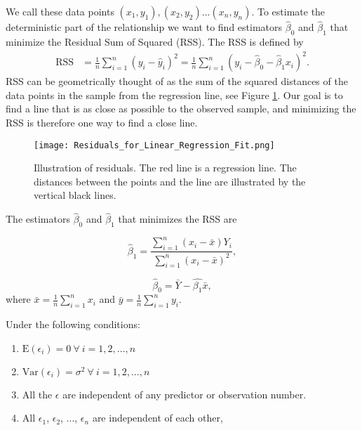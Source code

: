 \documentclass{article}
\begin{document}
We call these data points \((x_1, y_1), (x_2, y_2)
... (x_n, y_n)\). To estimate the deterministic part of the relationship we want
to find estimators \(\hat{\beta}_0\) and \(\hat{\beta}_1\) that minimize the
Residual Sum of Squared (RSS). The RSS is defined by
\begin{align*}
  \mathrm{RSS} &= \frac{1}{n} \sum_{i = 1}^n \left( y_i - \hat{y}_i \right)^2 
  = \frac{1}{n} \sum_{i = 1}^n \left( y_i - \hat{\beta}_0 - \hat{\beta}_1 x_i \right)^2.
\end{align*}
RSS can be geometrically thought of as the sum of the squared distances of
the data points in the sample from the regression line, see Figure \ref{fig:residuals}. Our goal is to find a
line that is as close as possible to the observed sample, and minimizing the RSS
is therefore one way to find a close line.

\begin{figure}
  \centering
  \texttt{[image: Residuals\_for\_Linear\_Regression\_Fit.png]}
  \caption{Illustration of residuals. The red line is a regression line. The
    distances between the points and the line are illustrated by the vertical
    black lines. \cite{residualsFigure}}
  \label{fig:residuals}
  
\end{figure}

The estimators \(\hat{\beta}_0\) and \(\hat{\beta}_1\) that minimizes the RSS are

\begin{equation*}
 \hat{\beta}_1 = \frac{\sum_{i = 1}^n\left( x_i - \bar{x} \right) Y_i}{\sum_{i = 1}^n\left( x_i - \bar{x} \right)^2} ,
\end{equation*}

\begin{equation*}
 \hat{\beta}_0 = \bar{Y} - \hat{\beta_1}\bar{x},
\end{equation*}
where \(\bar{x} = \frac{1}{n} \sum_{i = 1}^n x_i\) and \(\bar{y} = \frac{1}{n} \sum_{i = 1}^n y_i\).

Under the following conditions:

\begin{enumerate}
\item \(\mathrm{E} \left( \epsilon_i \right) = 0\ \forall \ i = 1, 2, ..., n\)
\item \(\mathrm{Var} \left( \epsilon_i \right) = \sigma^2\ \forall \ i = 1, 2, ..., n\)
\item All the \(\epsilon\) are independent of any predictor or observation number.
\item All \(\epsilon_1\), \(\epsilon_2\), ..., \(\epsilon_n\) are independent of each other,
\end{enumerate}
\end{document}
